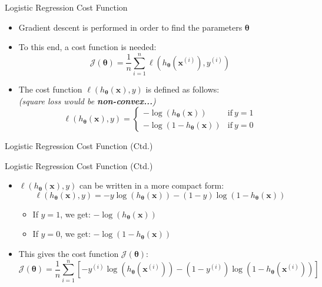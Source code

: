 \begin{frame}{Logistic Regression Cost Function}{}
	\begin{itemize}
		\item Gradient descent is performed in order to find the parameters $\bm{\theta}$
		\item To this end, a cost function is needed:
		\begin{equation}
			\mathcal{J}(\bm{\theta}) = \frac{1}{n} \sum_{i=1}^n \ell(h_{\bm{\theta}}(\bm{x}^{(i)}), y^{(i)})
		\end{equation}
		\item The cost function $\ell(h_{\bm{\theta}}(\bm{x}), y)$ is defined as follows: \\
		{\footnotesize \textit{(square loss would be \textbf{non-convex...})}}
		\begin{equation}
			\ell(h_{\bm{\theta}}(\bm{x}), y) =
			\begin{cases}
				-\log(h_{\bm{\theta}}(\bm{x})) 		& \text{if}\ y = 1	\\
				-\log(1 - h_{\bm{\theta}}(\bm{x}))	& \text{if}\ y = 0
			\end{cases}
		\end{equation}
	\end{itemize}
\end{frame}


\begin{frame}{Logistic Regression Cost Function (Ctd.)}{}
\end{frame}


\begin{frame}{Logistic Regression Cost Function (Ctd.)}{}\important
	\begin{itemize}
		\item $\ell(h_{\bm{\theta}}(\bm{x}), y)$ can be written in a more compact form:
		\begin{equation}
			\ell(h_{\bm{\theta}}(\bm{x}), y) = -y \log(h_{\bm{\theta}}(\bm{x})) -
				(1 - y) \log(1 - h_{\bm{\theta}}(\bm{x}))
		\end{equation}
		\vspace*{-6mm}
		\begin{itemize}
			\item If $y = 1$, we get: $-\log(h_{\bm{\theta}}(\bm{x}))$
			\item If $y = 0$, we get: $-\log(1 - h_{\bm{\theta}}(\bm{x}))$
		\end{itemize}
		\item This gives the  cost function $\mathcal{J}(\bm{\theta})$:
		\begin{equation}
			\mathcal{J}(\bm{\theta}) = \frac{1}{n} \sum_{i=1}^n \left[
				-y^{(i)} \log(h_{\bm{\theta}}(\bm{x}^{(i)})) - (1 - y^{(i)}) \log(1 - h_{\bm{\theta}}(\bm{x}^{(i)}))
			\right]
		\end{equation}
	\end{itemize}
\end{frame}


